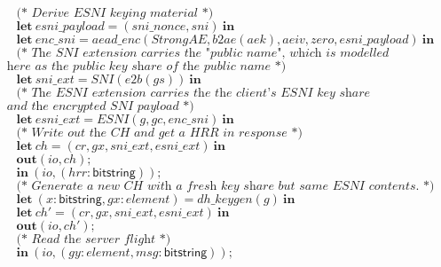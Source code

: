 \documentclass{article}
\theoremstyle{definition}
\newcommand{\kwl}[1]{\mathbf{#1}}
\newcommand{\kwt}[1]{\mathsf{#1}}
\newcommand{\var}[1]{\mathit{#1}}
\theoremstyle{definition}
\begin{document}
\begin{tabbing}
$ $\\
$\ \ \ \ \ \textit{(* Derive ESNI keying material *)} $\\
$\ \ \ \ \ \kwl{let}\ \var{esni{\_}payload} = (\var{sni{\_}nonce}, \var{sni})\ \kwl{in} $\\
$\ \ \ \ \ \kwl{let}\ \var{enc{\_}sni} = \var{aead{\_}enc}(\var{StrongAE}, \var{b2ae}(\var{aek}), \var{aeiv}, \var{zero}, \var{esni{\_}payload})\ \kwl{in} $\\
$ $\\
$\ \ \ \ \ \textit{(* The SNI extension carries the "public name", which is modelled }$\\
$\textit{        here as the public key share of the public name *)} $\\
$\ \ \ \ \ \kwl{let}\ \var{sni{\_}ext} = \var{SNI}(\var{e2b}(\var{gs}))\ \kwl{in} $\\
$ $\\
$\ \ \ \ \ \textit{(* The ESNI extension carries the the client's ESNI key share}$\\
$\textit{        and the encrypted SNI payload *)} $\\
$\ \ \ \ \ \kwl{let}\ \var{esni{\_}ext} = \var{ESNI}(\var{g}, \var{gc}, \var{enc{\_}sni})\ \kwl{in} $\\
$ $\\
$\ \ \ \ \ \textit{(* Write out the CH and get a HRR in response *)} $\\
$\ \ \ \ \ \kwl{let}\ \var{ch} = (\var{cr}, \var{gx}, \var{sni{\_}ext}, \var{esni{\_}ext})\ \kwl{in} $\\
$\ \ \ \ \ \kwl{out}(\var{io}, \var{ch}); $\\
$ $\\
$\ \ \ \ \ \kwl{in}\ (\var{io}, (\var{hrr}{:}\kwt{bitstring})); $\\
$ $\\
$\ \ \ \ \ \textit{(* Generate a new CH with a fresh key share but same ESNI contents. *)} $\\
$\ \ \ \ \ \kwl{let}\ (\var{x}{:}\kwt{bitstring}, \var{gx}{:}\var{element}) = \var{dh{\_}keygen}(\var{g})\ \kwl{in} $\\
$\ \ \ \ \ \kwl{let}\ \var{ch'} = (\var{cr}, \var{gx}, \var{sni{\_}ext}, \var{esni{\_}ext})\ \kwl{in} $\\
$\ \ \ \ \ \kwl{out}(\var{io}, \var{ch'}); $\\
$ $\\
$\ \ \ \ \ \textit{(* Read the server flight *)} $\\
$\ \ \ \ \ \kwl{in}\ (\var{io}, (\var{gy}{:}\var{element}, \var{msg}{:}\kwt{bitstring})); $\\

\end{tabbing}
\end{document}
